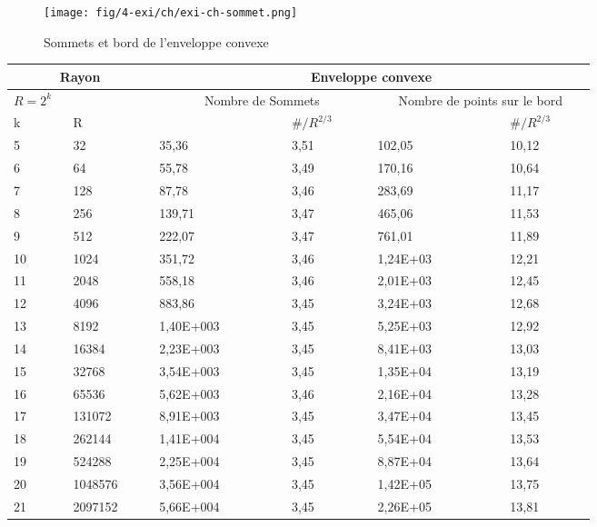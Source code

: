 \begin{figure}[H]
  \centering
  \texttt{[image: fig/4-exi/ch/exi-ch-sommet.png]}
  \caption{Sommets et bord de l'enveloppe convexe}
\end{figure}

\begin{table}[H]
  \begin{tabular}{|p{0.09\linewidth}|p{0.13\linewidth}||p{0.2\linewidth}|p{0.13\linewidth}||p{0.2\linewidth}|p{0.13\linewidth}|}
    \hline
    \multicolumn{2}{|c||}{Rayon} & \multicolumn{4}{c|}{Enveloppe convexe} \\  \hline 
    $R=2^k$  &  & \multicolumn{2}{c||}{Nombre de Sommets} &  \multicolumn{2}{c|}{Nombre de points sur le bord} \\ \hline 
    k & R &   & $\# / R^{2/3}$  &   & $\# / R^{2/3}$ \\    
    \hline
    5 & 32         & 35,36     & 3,51 & 102,05   &  10,12\\
    6 & 64         & 55,78     & 3,49 & 170,16   &  10,64\\
    7 & 128        & 87,78     & 3,46 & 283,69   &  11,17\\
    8 & 256        & 139,71    & 3,47 & 465,06   &  11,53\\
    9 & 512        & 222,07    & 3,47 & 761,01   &  11,89\\
    10 & 1024      & 351,72    & 3,46 & 1,24E+03 &  12,21\\
    11 & 2048      & 558,18    & 3,46 & 2,01E+03 &  12,45\\
    12 & 4096      & 883,86    & 3,45 & 3,24E+03 &  12,68\\
    13 & 8192      & 1,40E+003 & 3,45 & 5,25E+03 &  12,92\\
    14 & 16384     & 2,23E+003 & 3,45 & 8,41E+03 &  13,03\\
    15 & 32768     & 3,54E+003 & 3,45 & 1,35E+04 &  13,19\\
    16 & 65536     & 5,62E+003 & 3,46 & 2,16E+04 &  13,28\\
    17 & 131072    & 8,91E+003 & 3,45 & 3,47E+04 &  13,45\\
    18 & 262144    & 1,41E+004 & 3,45 & 5,54E+04 &  13,53\\
    19 & 524288    & 2,25E+004 & 3,45 & 8,87E+04 &  13,64\\
    20 & 1048576   & 3,56E+004 & 3,45 & 1,42E+05 &  13,75\\
    21 & 2097152   & 5,66E+004 & 3,45 & 2,26E+05 &  13,81\\

\end{tabular}
\end{table}
